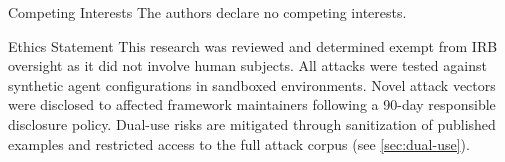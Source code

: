 \documentclass[
  ignorenonframetext,
]{beamer}
\begin{document}
\begin{frame}{Competing Interests}
\protect{}\label{competing-interests}
The authors declare no competing interests.
\end{frame}

\begin{frame}{Ethics Statement}
\protect{}\label{ethics-statement}
This research was reviewed and determined exempt from IRB oversight as
it did not involve human subjects. All attacks were tested against
synthetic agent configurations in sandboxed environments. Novel attack
vectors were disclosed to affected framework maintainers following a
90-day responsible disclosure policy. Dual-use risks are mitigated
through sanitization of published examples and restricted access to the
full attack corpus (see \cref{sec:dual-use}).
\end{frame}
\end{document}
